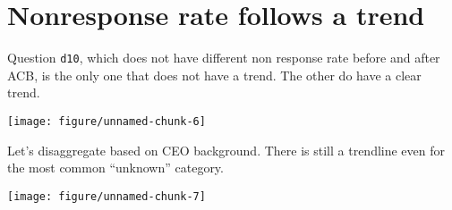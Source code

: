 \documentclass{article}\usepackage[]{graphicx}\usepackage[]{color}
\makeatletter
\def\maxwidth{ %
  \ifdim\Gin@nat@width>\linewidth
    \linewidth
  \else
    \Gin@nat@width
  \fi
}
\newenvironment{knitrout}{}{} %
\makeatother
\begin{document}
\section{Nonresponse rate follows a trend}

Question \verb`d10`, which does not have different non response rate before and after ACB, is the only one that does not have a trend. The other do have a clear trend.

\begin{knitrout}
\color{fgcolor}

{\centering \texttt{[image: figure/unnamed-chunk-6]} 

}



\end{knitrout}

Let's disaggregate based on CEO background. There is still a trendline even for the most common ``unknown'' category.

\begin{knitrout}
\color{fgcolor}

{\centering \texttt{[image: figure/unnamed-chunk-7]} 

}



\end{knitrout}
\end{document}

